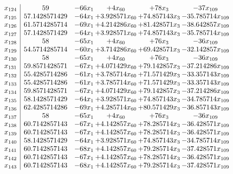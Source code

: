 \documentclass[11pt]{article}
\begin{document}
\[\begin{array}{c| c c@{\hskip 2pt} c@{\hskip 2pt} c@{\hskip 2pt} c@{\hskip 2pt} }
 x_{124}   &  59 & -66 x_{1} & + 4 x_{60} & + 78 x_{3} & -37 x_{109}\\
 x_{125}   &  57.1428571429 & -64 x_{1} & + 3.928571 x_{60} & + 74.857143 x_{3} & -35.785714 x_{109}\\
 x_{126}   &  61.5714285714 & -69 x_{1} & + 4.214286 x_{60} & + 81.428571 x_{3} & -38.642857 x_{109}\\
 x_{127}   &  57.1428571429 & -64 x_{1} & + 3.928571 x_{60} & + 74.857143 x_{3} & -35.785714 x_{109}\\
 x_{128}   &  58 & -65 x_{1} & + 4 x_{60} & + 76 x_{3} & -36 x_{109}\\
 x_{129}   &  54.5714285714 & -60 x_{1} & + 3.714286 x_{60} & + 69.428571 x_{3} & -32.142857 x_{109}\\
 x_{130}   &  58 & -65 x_{1} & + 4 x_{60} & + 76 x_{3} & -36 x_{109}\\
 x_{131}   &  59.8571428571 & -67 x_{1} & + 4.071429 x_{60} & + 79.142857 x_{3} & -37.214286 x_{109}\\
 x_{132}   &  55.4285714286 & -61 x_{1} & + 3.785714 x_{60} & + 71.571429 x_{3} & -33.357143 x_{109}\\
 x_{133}   &  55.4285714286 & -61 x_{1} & + 3.785714 x_{60} & + 71.571429 x_{3} & -33.357143 x_{109}\\
 x_{134}   &  59.8571428571 & -67 x_{1} & + 4.071429 x_{60} & + 79.142857 x_{3} & -37.214286 x_{109}\\
 x_{135}   &  58.1428571429 & -64 x_{1} & + 3.928571 x_{60} & + 74.857143 x_{3} & -34.785714 x_{109}\\
 x_{136}   &  62.4285714286 & -69 x_{1} & + 4.285714 x_{60} & + 80.571429 x_{3} & -36.857143 x_{109}\\
 x_{137}   &  58 & -65 x_{1} & + 4 x_{60} & + 76 x_{3} & -36 x_{109}\\
 x_{138}   &  60.7142857143 & -67 x_{1} & + 4.142857 x_{60} & + 78.285714 x_{3} & -36.428571 x_{109}\\
 x_{139}   &  60.7142857143 & -67 x_{1} & + 4.142857 x_{60} & + 78.285714 x_{3} & -36.428571 x_{109}\\
 x_{140}   &  58.1428571429 & -64 x_{1} & + 3.928571 x_{60} & + 74.857143 x_{3} & -34.785714 x_{109}\\
 x_{141}   &  60.7142857143 & -68 x_{1} & + 4.142857 x_{60} & + 79.285714 x_{3} & -37.428571 x_{109}\\
 x_{142}   &  60.7142857143 & -67 x_{1} & + 4.142857 x_{60} & + 78.285714 x_{3} & -36.428571 x_{109}\\
 x_{143}   &  60.7142857143 & -68 x_{1} & + 4.142857 x_{60} & + 79.285714 x_{3} & -37.428571 x_{109}\\

\end{array}\]
\end{document}
